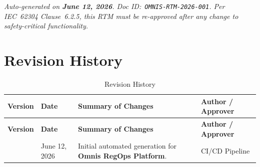 \documentclass[11pt]{article}
\begin{document}
\vspace{0.3cm}
{\small\textit{Auto-generated on \textbf{June 12, 2026}. Doc
ID:~\texttt{OMNIS-RTM-2026-001}. Per IEC~62304 Clause~6.2.5, this RTM must be
re-approved after any change to safety-critical functionality.}}

\newpage

\section{Revision History}

\begin{longtable}{@{} R{1.5cm} R{3.0cm} R{7.5cm} R{3.0cm} @{}}
\caption{Revision History \label{tab:revision-history}} \\
\toprule
\textbf{Version} &
\textbf{Date} &
\textbf{Summary of Changes} &
\textbf{Author / Approver} \\
\midrule
\endfirsthead
\toprule
\textbf{Version} &
\textbf{Date} &
\textbf{Summary of Changes} &
\textbf{Author / Approver} \\
\midrule
\endhead
\bottomrule
{} & June 12, 2026 &
    Initial automated generation for \textbf{Omnis RegOps Platform}. &
    CI/CD Pipeline \\
\end{longtable}

\label{LastPage}
\end{document}
